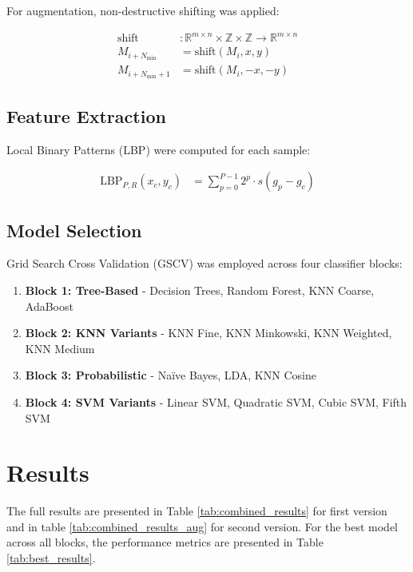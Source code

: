 \documentclass[10pt]{article}
\begin{document}
  For augmentation, non-destructive shifting was applied:
  
  \begin{equation*}
    \begin{aligned}
      \text{shift}&: \mathbb{R}^{m \times n} \times \mathbb{Z} \times \mathbb{Z} \to \mathbb{R}^{m \times n}\\
      M_{i+N_{\min}} &= \text{shift}(M_i, x, y)\\
      M_{i+N_{\min}+1} &= \text{shift}(M_i, -x, -y)
    \end{aligned}
  \end{equation*}

  \subsection{Feature Extraction}
  Local Binary Patterns (LBP) were computed for each sample:
  
  \begin{equation*}
    \begin{aligned}
      \text{LBP}_{P,R}(x_c, y_c) &= \sum_{p=0}^{P-1} 2^p \cdot s(g_p - g_c)
    \end{aligned}
  \end{equation*}

  \subsection{Model Selection}
  Grid Search Cross Validation (GSCV) was employed across four classifier blocks:
  
  \begin{enumerate}
    \item \textbf{Block 1: Tree-Based} - Decision Trees, Random Forest, KNN Coarse, AdaBoost
    \item \textbf{Block 2: KNN Variants} - KNN Fine, KNN Minkowski, KNN Weighted, KNN Medium
    \item \textbf{Block 3: Probabilistic} - Naïve Bayes, LDA, KNN Cosine
    \item \textbf{Block 4: SVM Variants} - Linear SVM, Quadratic SVM, Cubic SVM, Fifth SVM
  \end{enumerate}

  \section{Results}

  The full results are presented in Table \ref{tab:combined_results} for first version and in table \ref{tab:combined_results_aug} for second version.
  For the best model across all blocks, the performance metrics are presented in Table \ref{tab:best_results}.
\end{document}
